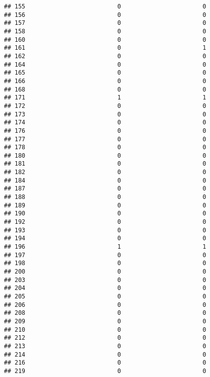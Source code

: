 \documentclass[
]{article}
\begin{document}
\begin{verbatim}
## 155                          0                       0
## 156                          0                       0
## 157                          0                       0
## 158                          0                       0
## 160                          0                       0
## 161                          0                       1
## 162                          0                       0
## 164                          0                       0
## 165                          0                       0
## 166                          0                       0
## 168                          0                       0
## 171                          1                       1
## 172                          0                       0
## 173                          0                       0
## 174                          0                       0
## 176                          0                       0
## 177                          0                       0
## 178                          0                       0
## 180                          0                       0
## 181                          0                       0
## 182                          0                       0
## 184                          0                       0
## 187                          0                       0
## 188                          0                       0
## 189                          0                       0
## 190                          0                       0
## 192                          0                       0
## 193                          0                       0
## 194                          0                       0
## 196                          1                       1
## 197                          0                       0
## 198                          0                       0
## 200                          0                       0
## 203                          0                       0
## 204                          0                       0
## 205                          0                       0
## 206                          0                       0
## 208                          0                       0
## 209                          0                       0
## 210                          0                       0
## 212                          0                       0
## 213                          0                       0
## 214                          0                       0
## 216                          0                       0
## 219                          0                       0

\end{verbatim}
\end{document}
